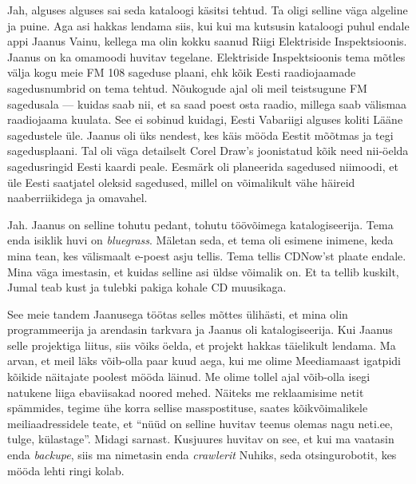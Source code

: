 Jah, alguses alguses sai seda kataloogi käsitsi tehtud. Ta oligi selline väga 
algeline ja puine. Aga asi hakkas lendama siis, kui kui ma kutsusin kataloogi 
puhul endale appi Jaanus Vainu, kellega ma olin kokku 
saanud Riigi Elektriside Inspektsioonis. 
Jaanus on ka omamoodi huvitav tegelane. Elektriside Inspektsioonis tema mõtles 
välja kogu meie FM 108 sageduse plaani, ehk kõik Eesti raadiojaamade 
sagedusnumbrid on tema tehtud. Nõukogude ajal oli meil teistsugune FM 
sagedusala --- kuidas saab nii, et sa saad poest osta raadio, millega saab 
välismaa raadiojaama kuulata. See ei sobinud kuidagi, Eesti Vabariigi alguses 
koliti Lääne sagedustele üle. Jaanus oli üks nendest, kes käis mööda Eestit  
mõõtmas ja tegi sagedusplaani. Tal oli väga detailselt Corel Draw's joonistatud kõik need nii-öelda sagedusringid Eesti kaardi peale. Eesmärk 
oli  planeerida sagedused niimoodi, et üle Eesti saatjatel oleksid sagedused, 
millel on võimalikult vähe häireid naaberriikidega ja omavahel.  


Jah. Jaanus on selline tohutu pedant,  tohutu  töövõimega katalogiseerija. 
Tema enda isiklik huvi on \emph{bluegrass}. Mäletan seda, et tema oli esimene 
inimene, keda mina tean, kes välismaalt e-poest asju tellis.  Tema tellis 
CDNow'st  plaate endale. Mina väga imestasin, et kuidas selline asi üldse 
võimalik on. Et ta tellib kuskilt, Jumal teab kust ja tulebki pakiga kohale CD 
muusikaga.


See meie tandem Jaanusega töötas selles mõttes ülihästi, et mina olin  
programmeerija ja arendasin tarkvara ja Jaanus oli  katalogiseerija.  Kui Jaanus 
selle projektiga liitus, siis võiks öelda, et projekt hakkas täielikult 
lendama. Ma arvan, et meil läks võib-olla paar kuud aega, kui me olime 
Meediamaast igatpidi kõikide näitajate poolest mööda läinud. 
Me olime tollel ajal võib-olla isegi natukene liiga ebaviisakad noored mehed. 
Näiteks me reklaamisime netit spämmides, tegime  ühe korra sellise 
masspostituse, saates kõikvõimalikele meiliaadressidele teate, et \enquote{nüüd 
on selline huvitav teenus olemas nagu neti.ee, tulge, külastage}. Midagi 
sarnast. Kusjuures huvitav on see, et kui ma vaatasin enda \emph{backupe}, siis 
ma nimetasin enda \emph{crawlerit} Nuhiks, seda otsingurobotit, kes mööda lehti 
ringi kolab. 

